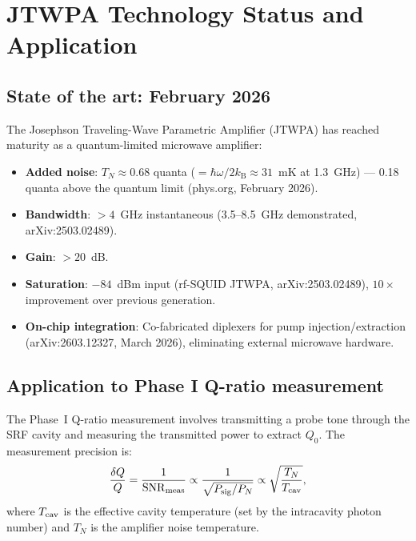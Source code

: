 \documentclass[11pt]{article}
\newcommand{\kB}{k_{\mathrm{B}}}
\newcommand{\SNR}{\mathrm{SNR}}
\theoremstyle{definition}
\theoremstyle{remark}
\begin{document}
\section{JTWPA Technology Status and Application}
\label{sec:JTWPA}

\subsection{State of the art: February 2026}

The Josephson Traveling-Wave Parametric Amplifier (JTWPA) has reached
maturity as a quantum-limited microwave amplifier:
\begin{itemize}[nosep]
\item \textbf{Added noise}: $T_N \approx 0.68$ quanta
  ($= \hbar\omega/2\kB \approx 31$~mK at 1.3~GHz) --- 0.18 quanta
  above the quantum limit (phys.org, February 2026).
\item \textbf{Bandwidth}: $> 4$~GHz instantaneous (3.5--8.5~GHz
  demonstrated, arXiv:2503.02489).
\item \textbf{Gain}: $> 20$~dB.
\item \textbf{Saturation}: $-84$~dBm input (rf-SQUID JTWPA,
  arXiv:2503.02489), $10\times$ improvement over previous generation.
\item \textbf{On-chip integration}: Co-fabricated diplexers for
  pump injection/extraction (arXiv:2603.12327, March 2026),
  eliminating external microwave hardware.
\end{itemize}

\subsection{Application to Phase I Q-ratio measurement}

The Phase~I Q-ratio measurement involves transmitting a probe tone
through the SRF cavity and measuring the transmitted power to extract
$Q_0$. The measurement precision is:
\begin{equation}
\frac{\delta Q}{Q} = \frac{1}{\SNR_{\rm meas}} \propto
\frac{1}{\sqrt{P_{\rm sig}/P_N}} \propto \sqrt{\frac{T_N}{T_{\rm cav}}},
\label{eq:Q_precision}
\end{equation}
where $T_{\rm cav}$ is the effective cavity temperature (set by
the intracavity photon number) and $T_N$ is the amplifier noise
temperature.
\end{document}

